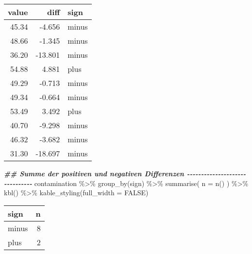 \documentclass[
]{book}
\newenvironment{Shaded}{\begin{snugshade}}{\end{snugshade}}
\newcommand{\AttributeTok}[1]{\textcolor[rgb]{0.77,0.63,0.00}{#1}}
\newcommand{\ConstantTok}[1]{\textcolor[rgb]{0.00,0.00,0.00}{#1}}
\newcommand{\DocumentationTok}[1]{\textcolor[rgb]{0.56,0.35,0.01}{\textbf{\textit{#1}}}}
\newcommand{\FunctionTok}[1]{\textcolor[rgb]{0.00,0.00,0.00}{#1}}
\newcommand{\NormalTok}[1]{#1}
\newcommand{\SpecialCharTok}[1]{\textcolor[rgb]{0.00,0.00,0.00}{#1}}
\begin{document}
\begin{table}
\centering
\begin{tabular}[t]{r|r|l}
\hline
value & diff & sign\\
\hline
45.34 & -4.656 & minus\\
\hline
48.66 & -1.345 & minus\\
\hline
36.20 & -13.801 & minus\\
\hline
54.88 & 4.881 & plus\\
\hline
49.29 & -0.713 & minus\\
\hline
49.34 & -0.664 & minus\\
\hline
53.49 & 3.492 & plus\\
\hline
40.70 & -9.298 & minus\\
\hline
46.32 & -3.682 & minus\\
\hline
31.30 & -18.697 & minus\\
\hline
\end{tabular}
\end{table}

\begin{Shaded}
\begin{Highlighting}[]
\DocumentationTok{\#\# Summe der positiven und negativen Differenzen {-}{-}{-}{-}{-}{-}{-}{-}{-}{-}{-}{-}{-}{-}{-}{-}{-}{-}{-}{-}{-}{-}{-}{-}{-}{-}{-}{-}{-}{-}{-}}
\NormalTok{contamination }\SpecialCharTok{\%\textgreater{}\%} 
  \FunctionTok{group\_by}\NormalTok{(sign) }\SpecialCharTok{\%\textgreater{}\%} 
  \FunctionTok{summarise}\NormalTok{(}
    \AttributeTok{n =} \FunctionTok{n}\NormalTok{()}
\NormalTok{  ) }\SpecialCharTok{\%\textgreater{}\%} 
  \FunctionTok{kbl}\NormalTok{() }\SpecialCharTok{\%\textgreater{}\%} 
  \FunctionTok{kable\_styling}\NormalTok{(}\AttributeTok{full\_width =} \ConstantTok{FALSE}\NormalTok{)}
\end{Highlighting}
\end{Shaded}

\begin{table}
\centering
\begin{tabular}[t]{l|r}
\hline
sign & n\\
\hline
minus & 8\\
\hline
plus & 2\\
\hline
\end{tabular}
\end{table}
\end{document}

